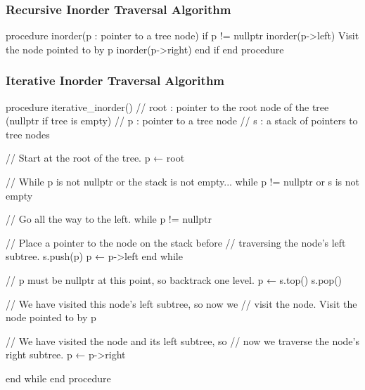 \documentclass{report}
\begin{document}
    \subsubsection{Recursive Inorder Traversal Algorithm}
    \bigbreak \noindent 
    \begin{cppcode}
    procedure inorder(p : pointer to a tree node)
        if p != nullptr
            inorder(p->left)
            Visit the node pointed to by p
            inorder(p->right)
        end if
    end procedure
    \end{cppcode}
    \bigbreak \noindent 
    \pagebreak 
    \subsubsection{Iterative Inorder Traversal Algorithm}
    \bigbreak \noindent 
    \begin{cppcode}
    procedure iterative_inorder()
        // root : pointer to the root node of the tree (nullptr if tree is empty)
        // p    : pointer to a tree node
        // s    : a stack of pointers to tree nodes

        // Start at the root of the tree.
        p ← root

        // While p is not nullptr or the stack is not empty... 
        while p != nullptr or s is not empty

            // Go all the way to the left.
            while p != nullptr

                // Place a pointer to the node on the stack before
                // traversing the node's left subtree.
                s.push(p)
                p ← p->left
            end while

            // p must be nullptr at this point, so backtrack one level.
            p ← s.top()
            s.pop()

            // We have visited this node's left subtree, so now we
            // visit the node.
            Visit the node pointed to by p

            // We have visited the node and its left subtree, so
            // now we traverse the node's right subtree.
            p ← p->right

        end while
    end procedure
    \end{cppcode}

    \pagebreak 
\end{document}
